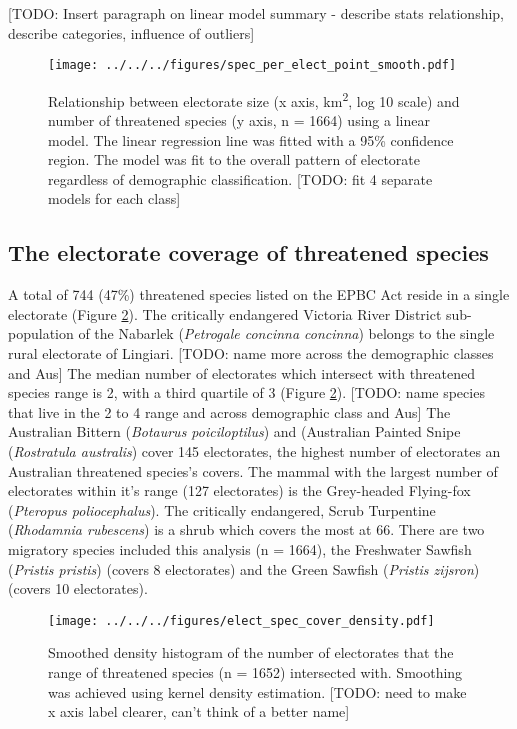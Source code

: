 \documentclass[a4paper,11pt]{article}
\begin{document}
[TODO: Insert paragraph on linear model summary - describe stats relationship, describe categories, influence of outliers]

\begin{figure}[H]
	\centering
    \texttt{[image: ../../../figures/spec\_per\_elect\_point\_smooth.pdf]}
    \caption{Relationship between electorate size (x axis, km\textsuperscript{2}, log 10 scale) and number of threatened species (y axis, n = 1664) using a linear model. The linear regression line was fitted with a 95\% confidence region. The model was fit to the overall pattern of electorate regardless of demographic classification. [TODO: fit 4 separate models for each class]}
    \label{fig:point_smooth}
\end{figure}

\subsection{The electorate coverage of threatened species}

A total of 744 (47\%) threatened species listed on the EPBC Act reside in a single electorate (Figure \ref{fig:hist}). 
The critically endangered Victoria River District sub-population of the Nabarlek (\emph{Petrogale concinna concinna}) belongs to the single rural electorate of Lingiari.
[TODO: name more across the demographic classes and Aus]
The median number of electorates which intersect with threatened species range is 2, with a third quartile of 3 (Figure \ref{fig:hist}). 
[TODO: name species that live in the 2 to 4 range and across demographic class and Aus]
The Australian Bittern (\emph{Botaurus poiciloptilus}) and (Australian Painted Snipe (\emph{Rostratula australis}) cover 145 electorates, the highest number of electorates an Australian threatened species's covers. The mammal with the largest number of electorates within it's range (127 electorates) is the Grey-headed Flying-fox (\emph{Pteropus poliocephalus}). The critically endangered, Scrub Turpentine (\emph{Rhodamnia rubescens}) is a shrub which covers the most at 66.
There are two migratory species included this analysis (n = 1664), the Freshwater Sawfish (\emph{Pristis pristis}) (covers 8 electorates) and the Green Sawfish (\emph{Pristis zijsron}) (covers 10 electorates).

\begin{figure}[H]
	\centering
    \texttt{[image: ../../../figures/elect\_spec\_cover\_density.pdf]}
    \caption{Smoothed density histogram of the number of electorates that the range of threatened species (n = 1652) intersected with. Smoothing was achieved using kernel density estimation. [TODO: need to make x axis label clearer, can't think of a better name]}
    \label{fig:hist}
\end{figure}
\end{document}
